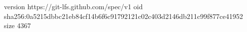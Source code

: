 version https://git-lfs.github.com/spec/v1
oid sha256:0a5215dbbc21eb84cf14b6f6c91792121c02c403d2146db211c99f877ce41952
size 4367
